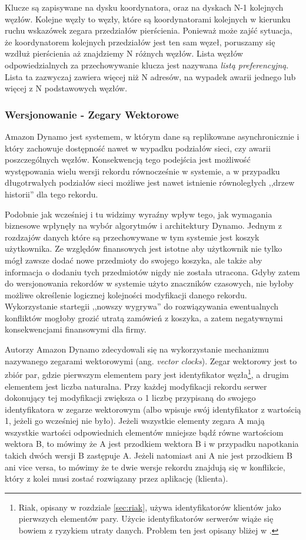 Klucze są zapisywane na dysku koordynatora, oraz na dyskach N-1 kolejnych węzłów.
Kolejne węzły to węzły, które są koordynatorami kolejnych w kierunku ruchu wskazówek zegara przedziałów pierścienia.
Ponieważ może zajść sytuacja, że koordynatorem kolejnych przedziałów jest ten sam węzeł, poruszamy się wzdłuż pierścienia aż znajdziemy N różnych węzłów.
Lista węzłów odpowiedzialnych za przechowywanie klucza jest nazywana \emph{listą preferencyjną}.
Lista ta zazwyczaj zawiera więcej niż N adresów, na wypadek awarii jednego lub więcej z N podstawowych węzłów.

\subsubsection*{Wersjonowanie - Zegary Wektorowe}
\label{sec:dynamo-vector-clocks}

Amazon Dynamo jest systemem, w którym dane są replikowane asynchronicznie i który zachowuje dostępność nawet w wypadku podziałów sieci, czy awarii poszczególnych węzłów.
Konsekwencją tego podejścia jest możliwość występowania wielu wersji rekordu równocześnie w systemie, a w przypadku długotrwałych podziałów sieci możliwe jest nawet istnienie równoległych ,,drzew historii'' dla tego rekordu.

Podobnie jak wcześniej i tu widzimy wyraźny wpływ tego, jak wymagania biznesowe wpłynęły na wybór algorytmów i architektury Dynamo.
Jednym z rozdzajów danych które są przechowywane w tym systemie jest koszyk użytkownika.
Ze względów finansowych jest istotne aby użytkownik nie tylko mógł zawsze dodać nowe przedmioty do swojego koszyka, ale także aby informacja o dodaniu tych przedmiotów nigdy nie została utracona.
Gdyby zatem do wersjonowania rekordów w systemie użyto znaczników czasowych, nie byłoby możliwe określenie logicznej kolejności modyfikacji danego rekordu.
Wykorzystanie startegii ,,nowszy wygrywa'' do rozwiązywania ewentualnych konfliktów mogłoby grozić utratą zamówień z koszyka, a zatem negatywnymi konsekwencjami finansowymi dla firmy.

Autorzy Amazon Dynamo zdecydowali się na wykorzystanie mechanizmu nazywanego zegarami wektorowymi (ang. \emph{vector clocks}).
Zegar wektorowy jest to zbiór par, gdzie pierwszym elementem pary jest identyfikator węzła\footnote{Riak, opisany w rozdziale \ref{sec:riak}, używa identyfikatorów klientów jako pierwszych elementów pary. Użycie identyfikatorów serwerów wiąże się bowiem z ryzykiem utraty danych. Problem ten jest opisany bliżej w \cite{basho-vector-clocks-hard}.}, a drugim elementem jest liczba naturalna.
Przy każdej modyfikacji rekordu serwer dokonujący tej modyfikacji zwiększa o 1 liczbę przypisaną do swojego identyfikatora w zegarze wektorowym (albo wpisuje swój identyfikator z wartością 1, jeżeli go wcześniej nie było).
Jeżeli wszystkie elementy zegara A mają wszystkie wartości odpowiednich elementów mniejsze bądź równe wartościom wektora B, to mówimy że A jest przodkiem wektora B i w przypadku napotkania takich dwóch wersji B zastępuje A.
Jeżeli natomiast ani A nie jest przodkiem B ani vice versa, to mówimy że te dwie wersje rekordu znajdują się w konflikcie, który z kolei musi zostać rozwiązany przez aplikację (klienta).

